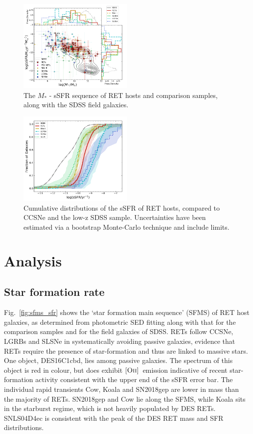 \documentclass[fleqn,usenatbib,]{mnras}
\newcommand{\OII}[0]{$[\textnormal{\textsc{Oii}}]$}
\begin{document}
\begin{figure}
\includegraphics[width=0.5\textwidth]{figs/sSFR_Mike.png}
\caption{The $M_*$ - sSFR sequence of RET hosts and comparison samples, along with the SDSS field galaxies.
\label{fig:sfms_ssfr}}
\end{figure}

\begin{figure}
\includegraphics[width=0.5\textwidth]{figs/cum_sSFR_mike.png}
\caption{Cumulative distributions of the sSFR of RET hosts, compared to CCSNe and the low-z SDSS sample. Uncertainties have been estimated via a bootstrap Monte-Carlo technique and include limits.
\label{fig:ssfr_cum}}
\end{figure}

\section{Analysis}
\label{sec:analysis} %

\subsection{Star formation rate \label{subsec:res_sfr}}
Fig.~\ref{fig:sfms_sfr} shows the `star formation main sequence' (SFMS) of RET host galaxies, as determined from photometric SED fitting along with that for the comparison samples and for the field galaxies of SDSS. RETs follow CCSNe, LGRBs and SLSNe in systematically avoiding passive galaxies, evidence that RETs require the presence of star-formation and thus are linked to massive stars. One object, DES16C1cbd, lies among passive galaxies. The spectrum of this object is red in colour, but does exhibit \OII~emission indicative of recent star-formation activity consistent with the upper end of the sSFR error bar. The individual rapid transients Cow, Koala and SN2018gep are lower in mass than the majority of RETs. SN2018gep and Cow lie along the SFMS, while Koala sits in the starburst regime, which is not heavily populated by DES RETs. SNLS04D4ec is consistent with the peak of the DES RET mass and SFR distributions. 
\end{document}
